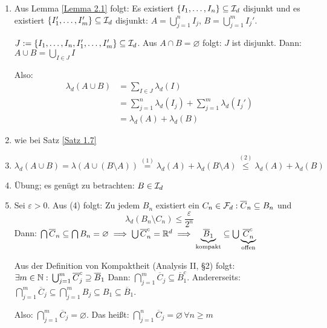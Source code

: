 \documentclass[a4paper,twoside,DIV15,BCOR12mm,chapterprefix=true,headings=onelinechapter]{scrbook}
\begin{document}
\begin{beweis}
\begin{enumerate}
\item Aus Lemma \ref{Lemma 2.1} folgt: Es existiert 
\(\{I_{1},\ldots,I_{n}\}\subseteq\mathcal{I}_{d}\)
disjunkt und es existiert \(\{I_{1}',\ldots,I_{m}'\}\subseteq\mathcal{I}_{d}\) disjunkt:
\(A=\bigcup_{j=1}^{n}{I_{j}},\,B=\bigcup_{j=1}^{m}{I_{j}'}\).

\(J:=\{I_{1},\ldots,I_{n},I_{1}',\ldots,I_{m}'\}\subseteq\mathcal{I}_{d}\). Aus 
\(A\cap B=\varnothing\) folgt: \(J\) ist disjunkt. Dann: 
\(A\cup B=\bigcup_{I\in J}{I}\)	%

Also:
\begin{align*}
\lambda_{d}(A\cup B)&=\sum_{I\in J}{\lambda_{d}(I)}\\
    &=\sum_{j=1}^{n}{\lambda_{d}(I_{j})}+\sum_{j=1}^{m}{\lambda_{d}(I_{j}')}\\
    &=\lambda_{d}(A)+\lambda_{d}(B)
\end{align*}
\item wie bei Satz \ref{Satz 1.7}
\item \(\lambda_{d}(A\cup B)=\lambda(A\cup(B\setminus A))\overset{(1)}{=}\lambda_{d}(A)+\lambda_{d}(B\setminus A)\overset{(2)}{\leq}\lambda_{d}(A)+\lambda_{d}(B)\) %
\item \"Ubung; es gen\"ugt zu betrachten: \(B\in\mathcal{I}_{d}\) %
\item Sei \(\varepsilon>0\). Aus (4) folgt: Zu jedem \(B_{n}\) existiert ein
\(C_{n}\in\mathcal{F}_{d}:\overline{C}_{n}\subseteq B_{n}\) und
\begin{equation}
\label{eq: Abschaetzung Mass -- Beweis Satz 2.3.(5)}
\lambda_{d}(B_{n}\setminus C_{n})\leq\frac{\varepsilon}{2^{n}}
\end{equation}
Dann:
\(\bigcap{\overline{C}_{n}}\subseteq\bigcap{B_{n}}=\varnothing\implies\bigcup{\overline{C}_{n}^{c}}=\mathbb{R}^{d}\implies\underbrace{\overline{B}_{1}}_{\text{kompakt}}\subseteq\bigcup{\underbrace{\overline{C}_{n}^{c}}_{\text{offen}}}\)

Aus der Definition von Kompaktheit (Analysis II, \S 2) folgt:
\(\exists m\in\mathbb{N}:\,\bigcup_{j=1}^{m}{\overline{C}_{j}^{c}}\supseteq\overline{B}_{1}\)
Dann: \(\bigcap_{j=1}^{m}{\overline{C}_{j}}\subseteq\overline{B}_{1}^{c}\).
Andererseits: \(\bigcap_{j=1}^{m}{\overline{C}_{j}}\subseteq\bigcap_{j=1}^{m}{B_{j}}\subseteq B_{1}\subseteq\overline{B}_{1}\). 

Also: \(\bigcap_{j=1}^{m}{\overline{C}_{j}}=\varnothing\). Das hei\ss t:
\(\bigcap_{j=1}^{n}{\overline{C}_{j}}=\varnothing\,\forall n\geq m\)


\end{enumerate}
\end{beweis}
\end{document}
